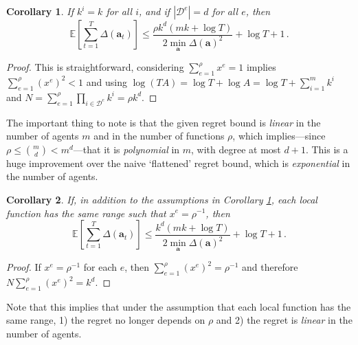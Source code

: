 \documentclass{article}
\newtheorem{corollary}{Corollary}
\begin{document}
\begin{corollary}\label{cor1}
If $k^i = k$ for all $i$, and if $|\mathcal{D}^e| = d$ for all $e$, then
\[
\mathbb{E} \left[ \sum_{t=1}^T \Delta(\mathbf{a}_t) \right] \le\frac{\rho k^d \left( m k + \log T \right)}{2 \min_\mathbf{a} \Delta(\mathbf{a})^2} + \log T + 1\,.
\]
\end{corollary}
\begin{proof}
This is straightforward, considering $\sum_{e=1}^\rho x^e = 1$ implies $\sum_{e=1}^\rho (x^e)^2 < 1$ and using $\log( T A ) = \log T + \log A = \log T + \sum_{i=1}^m k^i$ and $N = \sum_{e=1}^\rho \prod_{i \in \mathcal{D}^e} k^i = \rho k^d$.
\end{proof}
The important thing to note is that the given regret bound is \emph{linear} in the number of agents $m$ and in the number of functions $\rho$, which implies---since $\rho \le {m \choose d} < m^d$---that it is \emph{polynomial} in $m$, with degree at most $d+1$. This is a huge improvement over the naive `flattened' regret bound, which is \emph{exponential} in the number of agents.
\begin{corollary}
If, in addition to the assumptions in Corollary \ref{cor1}, each local function has the same range such that $x^e = \rho^{-1}$, then
\[
\mathbb{E} \left[ \sum_{t=1}^T \Delta(\mathbf{a}_t) \right] \le\frac{k^d \left( m k + \log T \right)}{2 \min_\mathbf{a} \Delta(\mathbf{a})^2} + \log T + 1\,.
\]
\end{corollary}
\begin{proof}
If $x^e = \rho^{-1}$ for each $e$, then $\sum_{e=1}^\rho (x^e)^2 = \rho^{-1}$ and therefore $N \sum_{e=1}^\rho (x^e)^2 = k^d$.
\end{proof}
Note that this implies that under the assumption that each local function has the same range, 1) the regret no longer depends on $\rho$ and 2) the regret is \emph{linear} in the number of agents.
\end{document}
